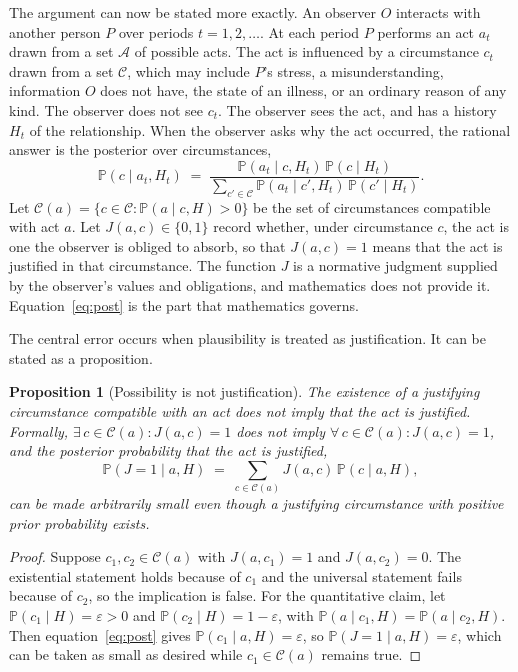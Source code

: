 \documentclass[11pt]{article}
\newtheorem{proposition}{Proposition}
\theoremstyle{definition}
\theoremstyle{remark}
\renewcommand{\Pr}{\mathbb{P}}
\begin{document}
The argument can now be stated more exactly. An observer $O$ interacts with another person $P$ over periods $t=1,2,\dots$. At each period $P$ performs an act $a_t$ drawn from a set $\mathcal{A}$ of possible acts. The act is influenced by a circumstance $c_t$ drawn from a set $\mathcal{C}$, which may include $P$'s stress, a misunderstanding, information $O$ does not have, the state of an illness, or an ordinary reason of any kind. The observer does not see $c_t$. The observer sees the act, and has a history $H_t$ of the relationship. When the observer asks why the act occurred, the rational answer is the posterior over circumstances,
\begin{equation}
\Pr(c \mid a_t, H_t) \;=\; \frac{\Pr(a_t \mid c, H_t)\,\Pr(c \mid H_t)}{\sum_{c'\in\mathcal{C}} \Pr(a_t \mid c', H_t)\,\Pr(c' \mid H_t)}.
\label{eq:post}
\end{equation}
Let $\mathcal{C}(a)=\{c\in\mathcal{C}:\Pr(a\mid c,H)>0\}$ be the set of circumstances compatible with act $a$. Let $J(a,c)\in\{0,1\}$ record whether, under circumstance $c$, the act is one the observer is obliged to absorb, so that $J(a,c)=1$ means that the act is justified in that circumstance. The function $J$ is a normative judgment supplied by the observer's values and obligations, and mathematics does not provide it. Equation~\eqref{eq:post} is the part that mathematics governs.

The central error occurs when plausibility is treated as justification. It can be stated as a proposition.

\begin{proposition}[Possibility is not justification]\label{prop:possibility}
The existence of a justifying circumstance compatible with an act does not imply that the act is justified. Formally, $\exists\, c\in\mathcal{C}(a):J(a,c)=1$ does not imply $\forall\, c\in\mathcal{C}(a):J(a,c)=1$, and the posterior probability that the act is justified,
\[
\Pr(J=1\mid a,H)\;=\;\sum_{c\in\mathcal{C}(a)}J(a,c)\,\Pr(c\mid a,H),
\]
can be made arbitrarily small even though a justifying circumstance with positive prior probability exists.
\end{proposition}

\begin{proof}
Suppose $c_1,c_2\in\mathcal{C}(a)$ with $J(a,c_1)=1$ and $J(a,c_2)=0$. The existential statement holds because of $c_1$ and the universal statement fails because of $c_2$, so the implication is false. For the quantitative claim, let $\Pr(c_1\mid H)=\varepsilon>0$ and $\Pr(c_2\mid H)=1-\varepsilon$, with $\Pr(a\mid c_1,H)=\Pr(a\mid c_2,H)$. Then equation~\eqref{eq:post} gives $\Pr(c_1\mid a,H)=\varepsilon$, so $\Pr(J=1\mid a,H)=\varepsilon$, which can be taken as small as desired while $c_1\in\mathcal{C}(a)$ remains true.
\end{proof}
\end{document}
